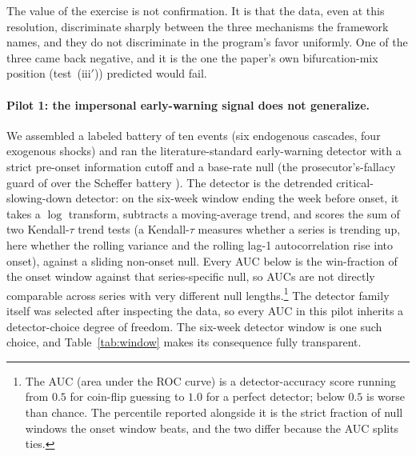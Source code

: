 \documentclass[11pt]{article}
\begin{document}
The value of the exercise is not confirmation. It is that the data, even at this resolution, discriminate sharply between the three mechanisms the framework names, and they do not discriminate in the program's favor uniformly. One of the three came back negative, and it is the one the paper's own bifurcation-mix position (test~(iii$'$)) predicted would fail.

\paragraph{Pilot 1: the impersonal early-warning signal does not generalize.} We assembled a labeled battery of ten events (six endogenous cascades, four exogenous shocks) and ran the literature-standard early-warning detector with a strict pre-onset information cutoff and a base-rate null (the prosecutor's-fallacy guard of \cite{boettiger2012} over the Scheffer battery \cite{scheffer2009}). The detector is the detrended critical-slowing-down detector: on the six-week window ending the week before onset, it takes a $\log$ transform, subtracts a moving-average trend, and scores the sum of two Kendall-$\tau$ trend tests (a Kendall-$\tau$ measures whether a series is trending up, here whether the rolling variance and the rolling lag-1 autocorrelation rise into onset), against a sliding non-onset null. Every AUC below is the win-fraction of the onset window against that series-specific null, so AUCs are not directly comparable across series with very different null lengths.\footnote{The AUC (area under the ROC curve) is a detector-accuracy score running from $0.5$ for coin-flip guessing to $1.0$ for a perfect detector; below $0.5$ is worse than chance. The percentile reported alongside it is the strict fraction of null windows the onset window beats, and the two differ because the AUC splits ties.} The detector family itself was selected after inspecting the data, so every AUC in this pilot inherits a detector-choice degree of freedom. The six-week detector window is one such choice, and Table~\ref{tab:window} makes its consequence fully transparent.
\end{document}
